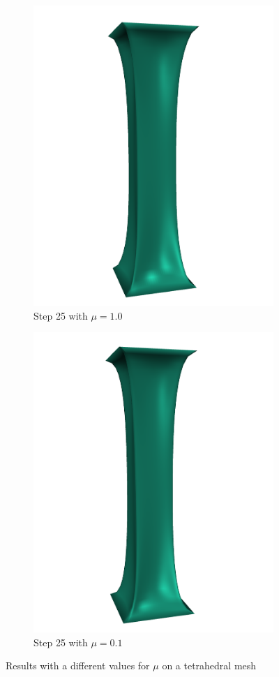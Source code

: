 \begin{figure}[!ht]
\centering
\begin{subfigure}{.47\textwidth}
  \centering
  \includegraphics[width=.8\linewidth]{resources/mu_res_new.png}  
  \caption{Step 25 with $\mu = 1.0$}
  \label{fig:mu_1}
\end{subfigure}
\begin{subfigure}{.47\textwidth}
  \centering
  \includegraphics[width=.8\linewidth]{resources/mu_mu_new.png}  
  \caption{Step 25 with $\mu = 0.1$}
  \label{fig:mu_2}
\end{subfigure}
\caption{Results with a different values for $\mu$ on a tetrahedral mesh}
\label{fig:mu}
\end{figure}

